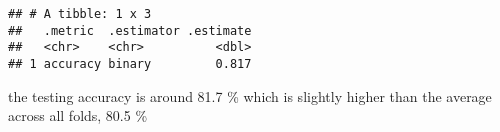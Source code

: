 \documentclass[]{article}
\newenvironment{Shaded}{\begin{snugshade}}{\end{snugshade}}
\newcommand{\DataTypeTok}[1]{\textcolor[rgb]{0.13,0.29,0.53}{#1}}
\newcommand{\KeywordTok}[1]{\textcolor[rgb]{0.13,0.29,0.53}{\textbf{#1}}}
\newcommand{\NormalTok}[1]{#1}
\newcommand{\OperatorTok}[1]{\textcolor[rgb]{0.81,0.36,0.00}{\textbf{#1}}}
\newcommand{\StringTok}[1]{\textcolor[rgb]{0.31,0.60,0.02}{#1}}
\begin{document}
\begin{Shaded}
\end{Shaded}

\begin{verbatim}
## # A tibble: 1 x 3
##   .metric  .estimator .estimate
##   <chr>    <chr>          <dbl>
## 1 accuracy binary         0.817
\end{verbatim}

the testing accuracy is around 81.7 \% which is slightly higher than the
average across all folds, 80.5 \%
\end{document}
